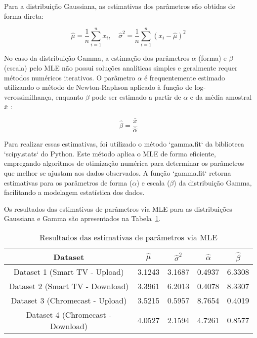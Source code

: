 Para a distribuição Gaussiana, as estimativas dos parâmetros são obtidas de forma direta:

\begin{equation}
    \hat{\mu} = \frac{1}{n} \sum_{i=1}^{n} x_i, \quad \hat{\sigma}^2 = \frac{1}{n} \sum_{i=1}^{n} (x_i - \hat{\mu})^2
\end{equation}

No caso da distribuição Gamma, a estimação dos parâmetros \(\alpha\) (forma) e \(\beta\) (escala) pelo MLE não possui soluções analíticas simples e geralmente requer métodos numéricos iterativos. O parâmetro \(\alpha\) é frequentemente estimado utilizando o método de Newton-Raphson aplicado à função de log-verossimilhança, enquanto \(\beta\) pode ser estimado a partir de \(\alpha\) e da média amostral \(\bar{x}\) \cite{minka2002estimating}:

\begin{equation}
    \hat{\beta} = \frac{\bar{x}}{\hat{\alpha}}
\end{equation}

Para realizar essas estimativas, foi utilizado o método `gamma.fit` da biblioteca `scipy.stats` do Python. Este método aplica o MLE de forma eficiente, empregando algoritmos de otimização numérica para determinar os parâmetros que melhor se ajustam aos dados observados. A função `gamma.fit` retorna estimativas para os parâmetros de forma (\(\alpha\)) e escala (\(\beta\)) da distribuição Gamma, facilitando a modelagem estatística dos dados.

Os resultados das estimativas de parâmetros via MLE para as distribuições Gaussiana e Gamma são apresentados na Tabela~\ref{tab:resultados_mle}.

\begin{table}[H]
    \centering
    \caption{Resultados das estimativas de parâmetros via MLE}
    \label{tab:resultados_mle}
    \begin{tabular}{|c|c|c|c|c|}
        \hline
        \textbf{Dataset} & \textbf{$\hat{\mu}$} & \textbf{$\hat{\sigma}^2$} & \textbf{$\hat{\alpha}$} & \textbf{$\hat{\beta}$} \\ 
        \hline
        Dataset 1 (Smart TV - Upload) & 3.1243 & 3.1687 & 0.4937 & 6.3308 \\ 
        \hline
        Dataset 2 (Smart TV - Download) & 3.3961 & 6.2013 & 0.4078 & 8.3307 \\ 
        \hline
        Dataset 3 (Chromecast - Upload) & 3.5215 & 0.5957 & 8.7654 & 0.4019 \\ 
        \hline
        Dataset 4 (Chromecast - Download) & 4.0527 & 2.1594 & 4.7261 & 0.8577 \\ 
        \hline
    \end{tabular}
\end{table}

